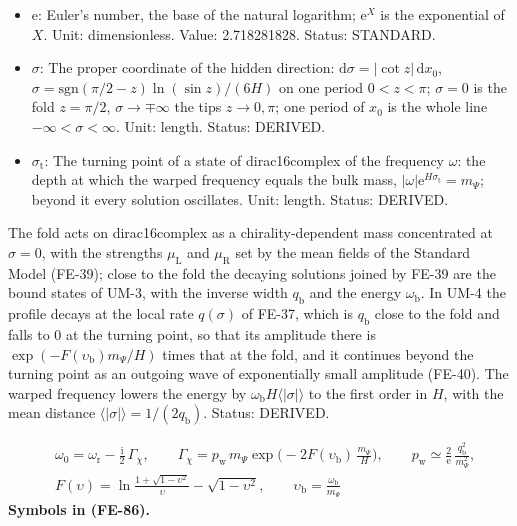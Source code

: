 \documentclass[
  10pt,
]{article}
\begin{document}
\begin{itemize}
  \(\chi_{\mathrm{b}}\): The profile of a state of dirac16complex at the
  fold (a resonance): it decays as
  \(\mathrm{e}^{-q_{\mathrm{b}}\lvert\sigma\rvert}\) out to the turning
  point and continues beyond it as an outgoing wave of exponentially
  small amplitude. Unit: GeV\(^{2}\). Status: DERIVED.
\item
  \(\mathrm{e}\): Euler's number, the base of the natural logarithm;
  \(\mathrm{e}^{X}\) is the exponential of \(X\). Unit: dimensionless.
  Value: 2.718281828. Status: STANDARD.
\item
  \(\sigma\): The proper coordinate of the hidden direction:
  \(\mathrm{d}\sigma = \lvert\cot z\rvert\,\mathrm{d}x_0\),
  \(\sigma = \mathrm{sgn}(\pi/2 - z)\ln(\sin z)/(6H)\) on one period
  \(0 < z < \pi\); \(\sigma = 0\) is the fold \(z = \pi/2\),
  \(\sigma \to \mp\infty\) the tips \(z \to 0, \pi\); one period of
  \(x_0\) is the whole line \(-\infty < \sigma < \infty\). Unit: length.
  Status: DERIVED.
\item
  \(\sigma_{\mathrm{t}}\): The turning point of a state of
  dirac16complex of the frequency \(\omega\): the depth at which the
  warped frequency equals the bulk mass,
  \(\lvert\omega\rvert\mathrm{e}^{H\sigma_{\mathrm{t}}} = m_\Psi\);
  beyond it every solution oscillates. Unit: length. Status: DERIVED.
\end{itemize}

The fold acts on dirac16complex as a chirality-dependent mass
concentrated at \(\sigma = 0\), with the strengths \(\mu_{\mathrm{L}}\)
and \(\mu_{\mathrm{R}}\) set by the mean fields of the Standard Model
(FE-39); close to the fold the decaying solutions joined by FE-39 are
the bound states of UM-3, with the inverse width \(q_{\mathrm{b}}\) and
the energy \(\omega_{\mathrm{b}}\). In UM-4 the profile decays at the
local rate \(q(\sigma)\) of FE-37, which is \(q_{\mathrm{b}}\) close to
the fold and falls to 0 at the turning point, so that its amplitude
there is \(\exp(-F(\upsilon_{\mathrm{b}})m_\Psi/H)\) times that at the
fold, and it continues beyond the turning point as an outgoing wave of
exponentially small amplitude (FE-40). The warped frequency lowers the
energy by \(\omega_{\mathrm{b}}H\langle\lvert\sigma\rvert\rangle\) to
the first order in \(H\), with the mean distance
\(\langle\lvert\sigma\rvert\rangle = 1/(2q_{\mathrm{b}})\). Status:
DERIVED.

\[
\begin{aligned}
&\omega_0 = \omega_{\mathrm{r}} - \frac{\mathrm{i}}{2}\,\Gamma_\chi,\qquad
\Gamma_\chi = p_{\mathrm{w}}\,m_\Psi\exp\Big(-2F(\upsilon_{\mathrm{b}})\,\frac{m_\Psi}{H}\Big),\qquad
p_{\mathrm{w}} \simeq \frac{2}{\mathrm{e}}\,\frac{q_{\mathrm{b}}^2}{m_\Psi^2},\\
&F(\upsilon) = \ln\frac{1 + \sqrt{1 - \upsilon^2}}{\upsilon} - \sqrt{1 - \upsilon^2},\qquad \upsilon_{\mathrm{b}} = \frac{\omega_{\mathrm{b}}}{m_\Psi}
\end{aligned} \tag{FE-86}
\] \textbf{Symbols in (FE-86).}
\end{document}
